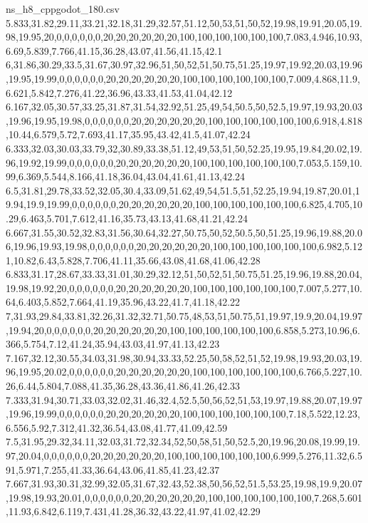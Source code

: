 \begin{filecontents*}[overwrite]{ns_h8_cppgodot_180.csv}
5.833,31.82,29.11,33.21,32.18,31.29,32.57,51.12,50,53,51,50,52,19.98,19.91,20.05,19.98,19.95,20,0,0,0,0,0,0,20,20,20,20,20,20,100,100,100,100,100,100,7.083,4.946,10.93,6.69,5.839,7.766,41.15,36.28,43.07,41.56,41.15,42.1
6,31.86,30.29,33.5,31.67,30.97,32.96,51,50,52,51,50.75,51.25,19.97,19.92,20.03,19.96,19.95,19.99,0,0,0,0,0,0,20,20,20,20,20,20,100,100,100,100,100,100,7.009,4.868,11.9,6.621,5.842,7.276,41.22,36.96,43.33,41.53,41.04,42.12
6.167,32.05,30.57,33.25,31.87,31.54,32.92,51.25,49,54,50.5,50,52.5,19.97,19.93,20.03,19.96,19.95,19.98,0,0,0,0,0,0,20,20,20,20,20,20,100,100,100,100,100,100,6.918,4.818,10.44,6.579,5.72,7.693,41.17,35.95,43.42,41.5,41.07,42.24
6.333,32.03,30.03,33.79,32,30.89,33.38,51.12,49,53,51,50,52.25,19.95,19.84,20.02,19.96,19.92,19.99,0,0,0,0,0,0,20,20,20,20,20,20,100,100,100,100,100,100,7.053,5.159,10.99,6.369,5.544,8.166,41.18,36.04,43.04,41.61,41.13,42.24
6.5,31.81,29.78,33.52,32.05,30.4,33.09,51.62,49,54,51.5,51,52.25,19.94,19.87,20.01,19.94,19.9,19.99,0,0,0,0,0,0,20,20,20,20,20,20,100,100,100,100,100,100,6.825,4.705,10.29,6.463,5.701,7.612,41.16,35.73,43.13,41.68,41.21,42.24
6.667,31.55,30.52,32.83,31.56,30.64,32.27,50.75,50,52,50.5,50,51.25,19.96,19.88,20.06,19.96,19.93,19.98,0,0,0,0,0,0,20,20,20,20,20,20,100,100,100,100,100,100,6.982,5.121,10.82,6.43,5.828,7.706,41.11,35.66,43.08,41.68,41.06,42.28
6.833,31.17,28.67,33.33,31.01,30.29,32.12,51,50,52,51,50.75,51.25,19.96,19.88,20.04,19.98,19.92,20,0,0,0,0,0,0,20,20,20,20,20,20,100,100,100,100,100,100,7.007,5.277,10.64,6.403,5.852,7.664,41.19,35.96,43.22,41.7,41.18,42.22
7,31.93,29.84,33.81,32.26,31.32,32.71,50.75,48,53,51,50.75,51,19.97,19.9,20.04,19.97,19.94,20,0,0,0,0,0,0,20,20,20,20,20,20,100,100,100,100,100,100,6.858,5.273,10.96,6.366,5.754,7.12,41.24,35.94,43.03,41.97,41.13,42.23
7.167,32.12,30.55,34.03,31.98,30.94,33.33,52.25,50,58,52,51,52,19.98,19.93,20.03,19.96,19.95,20.02,0,0,0,0,0,0,20,20,20,20,20,20,100,100,100,100,100,100,6.766,5.227,10.26,6.44,5.804,7.088,41.35,36.28,43.36,41.86,41.26,42.33
7.333,31.94,30.71,33.03,32.02,31.46,32.4,52.5,50,56,52,51,53,19.97,19.88,20.07,19.97,19.96,19.99,0,0,0,0,0,0,20,20,20,20,20,20,100,100,100,100,100,100,7.18,5.522,12.23,6.556,5.92,7.312,41.32,36.54,43.08,41.77,41.09,42.59
7.5,31.95,29.32,34.11,32.03,31.72,32.34,52,50,58,51,50,52.5,20,19.96,20.08,19.99,19.97,20.04,0,0,0,0,0,0,20,20,20,20,20,20,100,100,100,100,100,100,6.999,5.276,11.32,6.591,5.971,7.255,41.33,36.64,43.06,41.85,41.23,42.37
7.667,31.93,30.31,32.99,32.05,31.67,32.43,52.38,50,56,52,51.5,53.25,19.98,19.9,20.07,19.98,19.93,20.01,0,0,0,0,0,0,20,20,20,20,20,20,100,100,100,100,100,100,7.268,5.601,11.93,6.842,6.119,7.431,41.28,36.32,43.22,41.97,41.02,42.29

\end{filecontents*}
